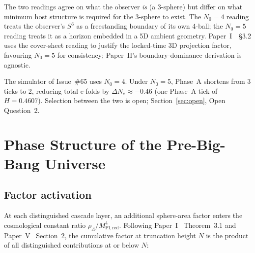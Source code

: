 \documentclass[12pt,a4paper]{article}
\begin{document}
The two readings agree on what the observer \emph{is} (a 3-sphere) but differ
on what minimum host structure is required for the 3-sphere to exist. The
$N_0 = 4$ reading treats the observer's $S^3$ as a freestanding boundary of
its own 4-ball; the $N_0 = 5$ reading treats it as a horizon embedded in a
5D ambient geometry. Paper~I~\cite{part1}~\S3.2 uses the cover-sheet reading
to justify the locked-time 3D projection factor, favouring $N_0 = 5$ for
consistency; Paper~II's boundary-dominance derivation is agnostic.

The simulator of Issue~\#65 uses $N_0 = 4$. Under $N_0 = 5$, Phase~A
shortens from 3 ticks to 2, reducing total e-folds by $\Delta N_e \approx
-0.46$ (one Phase~A tick of $H = 0.4607$). Selection between the two is
open; Section~\ref{sec:open}, Open Question~2.

\section{Phase Structure of the Pre-Big-Bang Universe}
\label{sec:phases}

\subsection{Factor activation}

At each distinguished cascade layer, an additional sphere-area factor enters the
cosmological constant ratio $\rho_\Lambda / M_{\mathrm{Pl,red}}^4$. Following
Paper~I~\cite{part1} Theorem~3.1 and Paper~V~\cite{part5} Section~2, the
cumulative factor at truncation height $N$ is the product of all distinguished
contributions at or below $N$:

\begin{center}
\renewcommand{\arraystretch}{1.25}
\end{center}
\end{document}
